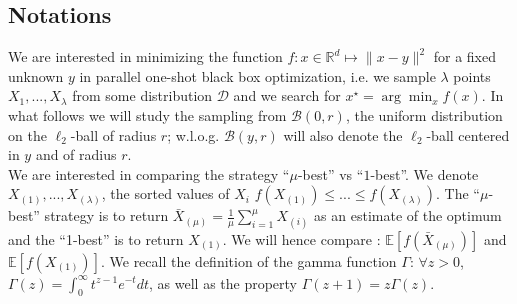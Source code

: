 \subsection{Notations}\label{notations}
We are interested in minimizing the function $f:x\in\mathbb{R}^d\mapsto \lVert x-y\rVert ^2$ for a fixed unknown $y$ in parallel one-shot black box optimization, i.e. we sample $\lambda$ points $X_1,...,X_\lambda$ from some distribution $\mathcal{D}$ and we search for $x^\star = \arg\min_x f(x)$. In what follows we will study the sampling from $\mathcal{B}(0,r)$, the uniform distribution on the $\ell_2$-ball of radius $r$; w.l.o.g. $\mathcal{B}(y,r)$ will also denote the $\ell_2$-ball centered in $y$ and of radius $r$.  \\
We are interested in comparing the strategy ``$\mu$-best'' vs ``$1$-best''. We denote $X_{(1)},...,X_{(\lambda)}$, the sorted values of $X_i$  $f(X_{(1)})\leq...\leq f(X_{(\lambda)})$. The ``$\mu$-best'' strategy is to return  $\bar{X}_{(\mu)} = \frac1\mu\sum_{i=1}^\mu X_{(i)}$ as an estimate of the optimum and the ``1-best'' is to return $X_{(1)}$. We will hence compare :
$\mathbb{E}\left[f\left(\bar{X}_{(\mu)}\right)\right]$ and $\mathbb{E}\left[f\left(X_{(1)}\right)\right]$. 
We recall the definition of the gamma function $\Gamma$: $\forall z>0$, $\Gamma(z) = \int_0^{\infty}t^{z-1}e^{-t}dt$, as well as the property $\Gamma(z+1)=z\Gamma(z)$.
